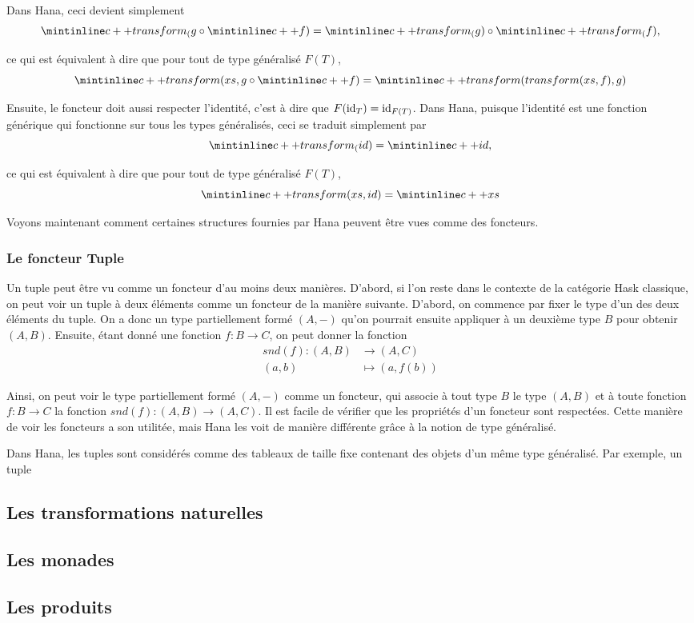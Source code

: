 Dans Hana, ceci devient simplement
\[
    \icpp{transform_(g} \circ \icpp{f)} = \icpp{transform_(g)} \circ \icpp{transform_(f)},
\]

ce qui est équivalent à dire que pour tout  de type généralisé $F(T)$,
\[
    \icpp{transform(xs, g} \circ \icpp{f)} = \icpp{transform(transform(xs, f), g)}
\]

Ensuite, le foncteur doit aussi respecter l'identité, c'est à dire que
$F(\mathrm{id}_T) = \mathrm{id}_{F(T)}$. Dans Hana, puisque l'identité est une fonction
générique qui fonctionne sur tous les types généralisés, ceci se traduit
simplement par
\[
    \icpp{transform_(id)} = \icpp{id},
\]

ce qui est équivalent à dire que pour tout  de type généralisé $F(T)$,
\[
    \icpp{transform(xs, id)} = \icpp{xs}
\]

Voyons maintenant comment certaines structures fournies par Hana peuvent
être vues comme des foncteurs.

\subsubsection{Le foncteur Tuple}
Un tuple peut être vu comme un foncteur d'au moins deux manières. D'abord,
si l'on reste dans le contexte de la catégorie Hask classique, on peut voir
un tuple à deux éléments comme un foncteur de la manière suivante. D'abord,
on commence par fixer le type d'un des deux éléments du tuple. On a donc
un type partiellement formé $(A, -)$ qu'on pourrait ensuite appliquer à un
deuxième type $B$ pour obtenir $(A, B)$. Ensuite, étant donné une fonction
$f : B \to C$, on peut donner la fonction
\begin{align*}
    snd(f) : (A, B) &\to (A, C)             \\
             (a, b) &\mapsto (a, f(b))
\end{align*}

Ainsi, on peut voir le type partiellement formé $(A, -)$ comme un foncteur,
qui associe à tout type $B$ le type $(A, B)$ et à toute fonction $f : B \to C$
la fonction $snd(f) : (A, B) \to (A, C)$. Il est facile de vérifier que les
propriétés d'un foncteur sont respectées. Cette manière de voir les foncteurs
a son utilitée, mais Hana les voit de manière différente grâce à la notion de
type généralisé.

Dans Hana, les tuples sont considérés comme des tableaux de taille fixe
contenant des objets d'un même type généralisé. Par exemple, un tuple



\subsection{Les transformations naturelles}
\subsection{Les monades}
\subsection{Les produits}
